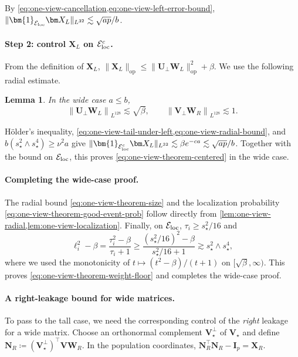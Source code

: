 \documentclass[11pt]{article}
\newtheorem{lemma}{Lemma}
\newcommand{\ind}{\bm{1}}
\newcommand{\trans}{\top}
\newcommand{\Lqn}[2]{\left\lVert #1\right\rVert_{L^{#2}}}
\newcommand{\cE}{\mathcal{E}}
\begin{document}
By \cref{eq:one-view-cancellation,eq:one-view-left-error-bound},
$\|\ind_{\cE_{\rm loc}}\bm X_L\|_{L^{32}}
\lesssim\sqrt{ap}/b$.

\paragraph{Step 2: control $\bm X_L$ on $\cE_{\rm loc}^c$.}
From the definition of $\bm X_L$,
$\|\bm X_L\|_{\mathrm{op}}
\le\|\bm U_\perp\bm W_L\|_{\mathrm{op}}^2+\beta$.
We use the following radial estimate.

\begin{lemma}
\label{lem:one-view-radial}
In the wide case $a\le b$,
\begin{equation}
\label{eq:one-view-radial-bound}
  \Lqn{\bm U_\perp\bm W_L}{128}
  \lesssim
  \sqrt\beta,
  \qquad
  \Lqn{\bm V_\perp\bm W_R}{128}
  \lesssim
  1.
\end{equation}
\end{lemma}

H\"older's inequality,
\cref{eq:one-view-tail-under-left,eq:one-view-radial-bound}, and
$b(s_\star^2\wedge s_\star^4)\ge\nu^2a$ give
$\|\ind_{\cE_{\rm loc}^c}\bm X_L\|_{L^{32}}
\lesssim
\beta e^{-ca}\lesssim\sqrt{ap}/b$.
Together with the bound on $\cE_{\rm loc}$, this proves
\cref{eq:one-view-theorem-centered} in the wide case.

\paragraph{Completing the wide-case proof.}
The radial bound \cref{eq:one-view-theorem-size} and the localization
probability \cref{eq:one-view-theorem-good-event-prob} follow directly
from \cref{lem:one-view-radial,lem:one-view-localization}.
Finally, on $\cE_{\rm loc}$,
$\tau_i\ge s_\star^2/16$ and
\[
  \ell_i^2-\beta
  =
  \frac{\tau_i^2-\beta}{\tau_i+1}
  \ge
  \frac{(s_\star^2/16)^2-\beta}{s_\star^2/16+1}
  \gtrsim
  s_\star^2\wedge s_\star^4,
\]
where we used the monotonicity of
$t\mapsto(t^2-\beta)/(t+1)$ on $[\sqrt\beta,\infty)$.
This proves \cref{eq:one-view-theorem-weight-floor} and completes the
wide-case proof.

\paragraph{A right-leakage bound for wide matrices.}
To pass to the tall case, we need the corresponding control of the
\emph{right} leakage for a wide matrix. Choose an orthonormal complement
$\bm V_\star^\perp$ of $\bm V_\star$ and define
$\bm N_R\coloneqq(\bm V_\star^\perp)^\trans\bm V\bm W_R$.
In the population coordinates,
$\bm N_R^\trans\bm N_R-\bm I_p=\bm X_R$.
\end{document}

